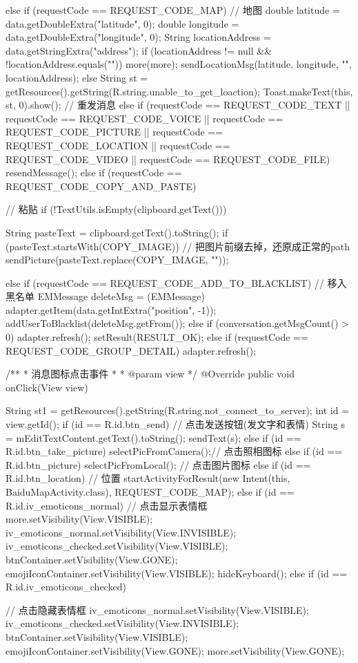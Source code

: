 {{{{			} else if (requestCode == REQUEST_CODE_MAP) { // 地图
				double latitude = data.getDoubleExtra("latitude", 0);
				double longitude = data.getDoubleExtra("longitude", 0);
				String locationAddress = data.getStringExtra("address");
				if (locationAddress != null && !locationAddress.equals("")) {
					more(more);
					sendLocationMsg(latitude, longitude, "", locationAddress);
				} else {
					String st = getResources().getString(R.string.unable_to_get_loaction);
					Toast.makeText(this, st, 0).show();
				}
				// 重发消息
			} else if (requestCode == REQUEST_CODE_TEXT || requestCode == REQUEST_CODE_VOICE
					|| requestCode == REQUEST_CODE_PICTURE || requestCode == REQUEST_CODE_LOCATION
					|| requestCode == REQUEST_CODE_VIDEO || requestCode == REQUEST_CODE_FILE) {
				resendMessage();
			} else if (requestCode == REQUEST_CODE_COPY_AND_PASTE) {
				// 粘贴
				if (!TextUtils.isEmpty(clipboard.getText())) {
					String pasteText = clipboard.getText().toString();
					if (pasteText.startsWith(COPY_IMAGE)) {
						// 把图片前缀去掉，还原成正常的path
						sendPicture(pasteText.replace(COPY_IMAGE, ""));
					}

				}
			} else if (requestCode == REQUEST_CODE_ADD_TO_BLACKLIST) { // 移入黑名单
				EMMessage deleteMsg = (EMMessage) adapter.getItem(data.getIntExtra("position", -1));
				addUserToBlacklist(deleteMsg.getFrom());
			} else if (conversation.getMsgCount() > 0) {
				adapter.refresh();
				setResult(RESULT_OK);
			} else if (requestCode == REQUEST_CODE_GROUP_DETAIL) {
				adapter.refresh();
			}
		}
	}

	/**
	 * 消息图标点击事件
	 * 
	 * @param view
	 */
	@Override
	public void onClick(View view) {
		String st1 = getResources().getString(R.string.not_connect_to_server);
		int id = view.getId();
		if (id == R.id.btn_send) {// 点击发送按钮(发文字和表情)
			String s = mEditTextContent.getText().toString();
			sendText(s);
		} else if (id == R.id.btn_take_picture) {
			selectPicFromCamera();// 点击照相图标
		} else if (id == R.id.btn_picture) {
			selectPicFromLocal(); // 点击图片图标
		} else if (id == R.id.btn_location) { // 位置
			startActivityForResult(new Intent(this, BaiduMapActivity.class), REQUEST_CODE_MAP);
		} else if (id == R.id.iv_emoticons_normal) { // 点击显示表情框
			more.setVisibility(View.VISIBLE);
			iv_emoticons_normal.setVisibility(View.INVISIBLE);
			iv_emoticons_checked.setVisibility(View.VISIBLE);
			btnContainer.setVisibility(View.GONE);
			emojiIconContainer.setVisibility(View.VISIBLE);
			hideKeyboard();
		} else if (id == R.id.iv_emoticons_checked) { // 点击隐藏表情框
			iv_emoticons_normal.setVisibility(View.VISIBLE);
			iv_emoticons_checked.setVisibility(View.INVISIBLE);
			btnContainer.setVisibility(View.VISIBLE);
			emojiIconContainer.setVisibility(View.GONE);
			more.setVisibility(View.GONE);

}}}
